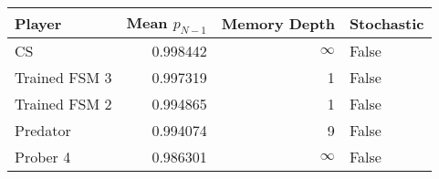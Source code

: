 \begin{tabular}{lrrl}
\toprule
        Player &  Mean $p_{N-1}$ &  Memory Depth & Stochastic \\
\midrule
            CS &        0.998442 &            \(\infty\) &      False \\
 Trained FSM 3 &        0.997319 &             1 &      False \\
 Trained FSM 2 &        0.994865 &             1 &      False \\
      Predator &        0.994074 &             9 &      False \\
      Prober 4 &        0.986301 &            \(\infty\) &      False \\
\bottomrule
\end{tabular}

